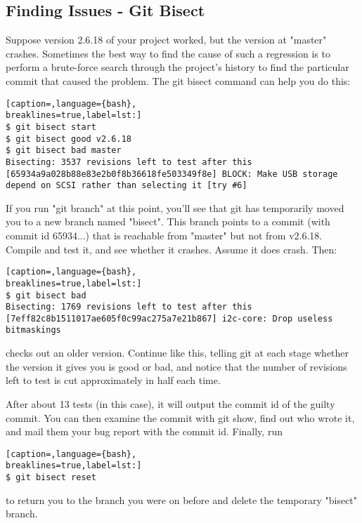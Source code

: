 \subsection{Finding Issues - Git Bisect}
Suppose version 2.6.18 of your project worked, but the version at "master"
crashes. Sometimes the best way to find the cause of such a regression is to
perform a brute-force search through the project's history to find the
particular commit that caused the problem. The git bisect command can help you
do this:
\lstset{basicstyle=\scriptsize, numbers=none, captionpos=b, tabsize=4}
\begin{lstlisting}[caption=,language={bash},
breaklines=true,label=lst:]
$ git bisect start
$ git bisect good v2.6.18
$ git bisect bad master
Bisecting: 3537 revisions left to test after this
[65934a9a028b88e83e2b0f8b36618fe503349f8e] BLOCK: Make USB storage depend on SCSI rather than selecting it [try #6]
\end{lstlisting}

If you run "git branch" at this point, you'll see that git has temporarily
moved you to a new branch named "bisect". This branch points to a commit (with
commit id 65934...) that is reachable from "master" but not from v2.6.18.
Compile and test it, and see whether it crashes. Assume it does crash. Then:
\lstset{basicstyle=\scriptsize, numbers=none, captionpos=b, tabsize=4}
\begin{lstlisting}[caption=,language={bash},
breaklines=true,label=lst:]
$ git bisect bad
Bisecting: 1769 revisions left to test after this
[7eff82c8b1511017ae605f0c99ac275a7e21b867] i2c-core: Drop useless bitmaskings
\end{lstlisting}

checks out an older version. Continue like this, telling git at each stage
whether the version it gives you is good or bad, and notice that the number of
revisions left to test is cut approximately in half each time.

After about 13 tests (in this case), it will output the commit id of the guilty
commit. You can then examine the commit with git show, find out who wrote it,
and mail them your bug report with the commit id. Finally, run
\lstset{basicstyle=\scriptsize, numbers=none, captionpos=b, tabsize=4}
\begin{lstlisting}[caption=,language={bash},
breaklines=true,label=lst:]
$ git bisect reset
\end{lstlisting}

to return you to the branch you were on before and delete the temporary
"bisect" branch.

